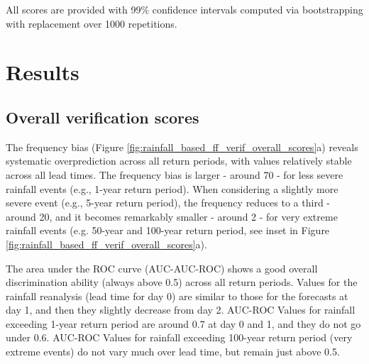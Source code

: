 All scores are provided with 99\% confidence intervals computed via bootstrapping with replacement over 1000 repetitions.


\section{Results}
\label{flash_flood_focused_verification_rainfall_based_ff_results}


\subsection{Overall verification scores}

The  frequency bias (Figure \ref{fig:rainfall_based_ff_verif_overall_scores}a) reveals systematic overprediction across all return periods, with values relatively stable across all lead times. The frequency bias is larger - around 70 - for less severe rainfall events (e.g., 1-year return period). When considering a slightly more severe event (e.g., 5-year return period), the frequency reduces to a third - around 20, and it becomes remarkably smaller - around 2 - for very extreme rainfall events (e.g. 50-year and 100-year return period, see inset in Figure \ref{fig:rainfall_based_ff_verif_overall_scores}a). 

The  area under the ROC curve (AUC-AUC-ROC) shows a good overall discrimination ability (always above 0.5) across all return periods. Values for the rainfall reanalysis (lead time for day 0) are similar to those for the forecasts at day 1, and then they slightly decrease from day 2. AUC-ROC Values for rainfall exceeding 1-year return period are around 0.7 at day 0 and 1, and they do not go under 0.6. AUC-ROC Values for rainfall exceeding 100-year return period (very extreme events) do not vary much over lead time, but remain just above 0.5. 


